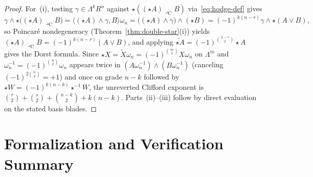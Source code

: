 \documentclass[11pt]{article}
\theoremstyle{definition}
\begin{document}
\begin{proof}
For~(i), testing $\gamma \in \Lambda^k R^n$ against $\star((\star A) \mathbin{\lrcorner_{\mathrm{C}}} B)$ via~\eqref{eq:hodge-def} gives
\[
\gamma \wedge \star\bigl((\star A) \mathbin{\lrcorner_{\mathrm{C}}} B\bigr)
= \langle (\star A) \wedge \gamma, B \rangle \omega_n
= \bigl((\star A) \wedge \gamma\bigr) \wedge (\star B)
= (-1)^{k(n-r)} \gamma \wedge \star(A \vee B),
\]
so Poincar\'e nondegeneracy (Theorem~\ref{thm:double-star}(i)) yields $(\star A) \mathbin{\lrcorner_{\mathrm{C}}} B = (-1)^{k(n-r)} (A \vee B)$, and applying $\widetilde{\star A} = (-1)^{\binom{n-r}{2}} \star A$ gives the Dorst formula. Since $\star X = \widetilde{X}\omega_n = (-1)^{\binom{m}{2}} X\omega_n$ on $\Lambda^m$ and $\omega_n^{-1} = (-1)^{\binom{n}{2}}\omega_n$ appears twice in $(A\omega_n^{-1}) \wedge (B\omega_n^{-1})$ (canceling $(-1)^{2\binom{n}{2}} = +1$) and once on grade $n - k$ followed by $\star W = (-1)^{k(n-k)}\star^{-1} W$, the unreverted Clifford exponent is $\binom{r}{2} + \binom{s}{2} + \binom{n-k}{2} + k(n-k)$. Parts~(ii)--(iii) follow by direct evaluation on the stated basis blades.
\end{proof}

\section{Formalization and Verification Summary}
\end{document}
